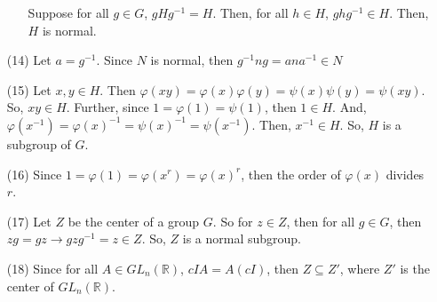 \documentclass[12pt]{article}
\begin{document}
\begin{itemize}
\begin{itemize}
Suppose for all $g \in G$, $gHg^{-1} = H$. Then, for all $h \in H$, $ghg^{-1} \in H$. Then, $H$ is normal. 
\end{itemize}
\item[(14)]
Let $a = g^{-1}$. Since $N$ is normal, then $g^{-1}ng = ana^{-1} \in N$
\item[(15)]
Let $x, y \in H$. Then $\varphi(xy) = \varphi(x)\varphi(y) = \psi(x)\psi(y) = \psi(xy)$. So, $xy \in H$. Further, since $1 = \varphi(1) = \psi(1)$, then $1 \in H$. And, $\varphi(x^{-1}) = \varphi(x)^{-1} = \psi(x)^{-1} = \psi(x^{-1})$. Then, $x^{-1} \in H$. So, $H$ is a subgroup of $G$.
\item[(16)]
Since $1 = \varphi(1) = \varphi(x^r) = \varphi(x)^r$, then the order of $\varphi(x)$ divides $r$.
\item[(17)]
Let $Z$ be the center of a group $G$. So for $z \in Z$, then for all $g \in G$, then $zg = gz \rightarrow gzg^{-1} = z \in Z$. So, $Z$ is a normal subgroup.
\item[(18)]
Since for all $A \in GL_n(\mathbb{R})$, $cIA = A(cI)$, then $Z \subseteq Z'$, where $Z'$ is the center of $GL_n(\mathbb{R})$. 


\end{itemize}
\end{document}
